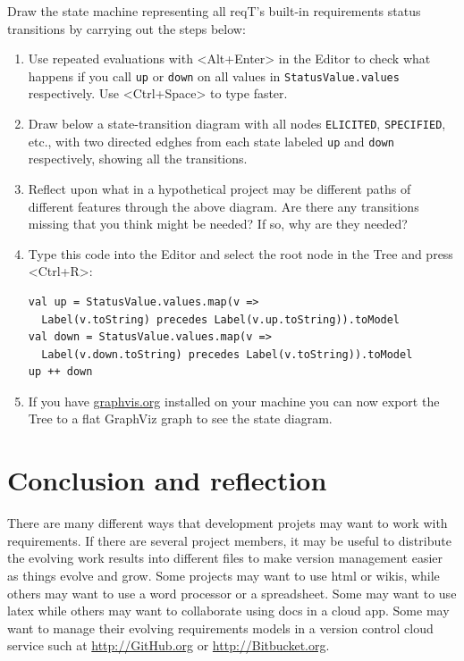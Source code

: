 \documentclass[11pt]{article}
\begin{document}
\newpage %
\begin{framed}
\noindent Draw the state machine representing all reqT's built-in requirements status transitions by carrying out the steps below:
\begin{enumerate}
\item Use repeated evaluations with <Alt+Enter> in the Editor to check what happens if you call \verb+up+ or  \verb+down+ on all values in \verb+StatusValue.values+ respectively. Use <Ctrl+Space> to type faster. 
\item Draw below a state-transition diagram with all nodes \verb+ELICITED+, \verb+SPECIFIED+, etc., with two directed edghes from each state labeled \verb+up+ and \verb+down+ respectively, showing all the transitions. \newline
\vspace{7cm}
\item Reflect upon what in a hypothetical project may be different paths of different features through the above diagram. Are there any transitions missing that you think might be needed? If so, why are they needed?
\item Type this code into the Editor and select the root node in the Tree and press <Ctrl+R>:{\scriptsize\begin{verbatim}
val up = StatusValue.values.map(v => 
  Label(v.toString) precedes Label(v.up.toString)).toModel
val down = StatusValue.values.map(v => 
  Label(v.down.toString) precedes Label(v.toString)).toModel
up ++ down
\end{verbatim}}
\item If you have \url{graphvis.org} installed on your machine you can now export the Tree to a flat GraphViz graph to see the state diagram.
\end{enumerate}
\end{framed}


\section{Conclusion and reflection}

There are many different ways that development projets may want to work with requirements. If there are several project members, it may be useful to distribute the evolving work results into different files to make version management easier as things evolve and grow. Some projects may want to use html or wikis, while others may want to use a word processor or a spreadsheet. Some may want to use latex while others may want to collaborate using docs in a cloud app. Some may want to manage their evolving requirements models in a version control cloud service such at \url{http://GitHub.org} or \url{http://Bitbucket.org}. 
\end{document}

